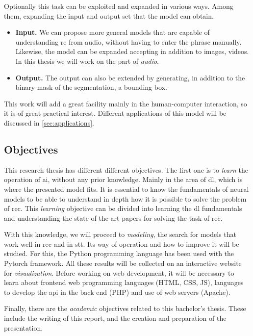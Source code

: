 Optionally this task can be exploited and expanded in various ways. Among them,
expanding the input and output set that the model can obtain.
\begin{itemize}
  \item \textbf{Input.} We can propose more general models that are capable
  of understanding \gls{re} from audio, without having to enter the phrase
  manually. Likewise, the model can be expanded accepting in addition to
  images, videos. In this thesis we will work on the part of \emph{audio}.
  \item \textbf{Output.} The output can also be extended by generating, in
  addition to the binary mask of the segmentation, a bounding box.
\end{itemize}

This work will add a great facility mainly in the human-computer interaction,
so it is of great practical interest. Different applications of this model will
be discussed in \vref{sec:applications}.


\subsection{Objectives}

This research thesis has different different objectives. The first one is to
\emph{learn} the operation of \gls{ai}, without any prior knowledge. Mainly in
the area of \gls{dl}, which is where the presented model fits. It is essential
to know the fundamentals of neural models to be able to understand in depth how
it is possible to solve the problem of \gls{rec}. This \emph{learning}
objective can be divided into learning the \gls{dl} fundamentals and
understanding the state-of-the-art papers for solving the task of \gls{rec}.

With this knowledge, we will proceed to \emph{modeling}, the search for models
that work well in \gls{rec} and in \gls{stt}. Its way of operation and how to
improve it will be studied. For this, the Python programming language has been
used with the Pytorch framework. All these results will be collected on an
interactive website for \emph{visualization}. Before working on web
development, it will be necessary to learn about frontend web programming
languages (HTML, CSS, JS), languages to develop the \gls{api} in the back end
(PHP) and use of web servers (Apache).

Finally, there are the \emph{academic} objectives related to this bachelor's
thesis. These include the writing of this report, and the creation and
preparation of the presentation.


